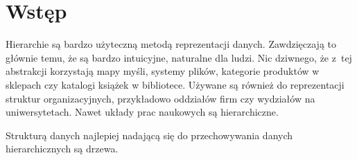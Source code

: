 \chapter{Wstęp}









Hierarchie są bardzo użyteczną metodą reprezentacji danych.
Zawdzięczają to głównie temu, że są bardzo intuicyjne, naturalne dla ludzi.
Nic dziwnego, że z~tej abstrakcji korzystają mapy myśli, systemy plików, kategorie produktów w sklepach czy katalogi książek w bibliotece.
Używane są również do reprezentacji struktur organizacyjnych, przykładowo oddziałów firm czy wydziałów na uniwersytetach.
Nawet układy prac naukowych są hierarchiczne.



Strukturą danych najlepiej nadającą się do przechowywania danych hierarchicznych są drzewa.




